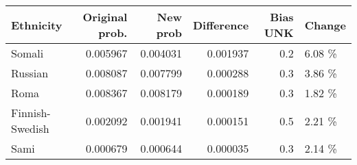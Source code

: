 \begin{tabular}{lrrrrl}
\toprule
      Ethnicity &  Original prob. &  New prob &  Difference &  Bias UNK & Change \\
\midrule
         Somali &        0.005967 &  0.004031 &    0.001937 &       0.2 & 6.08 \% \\
        Russian &        0.008087 &  0.007799 &    0.000288 &       0.3 & 3.86 \% \\
           Roma &        0.008367 &  0.008179 &    0.000189 &       0.3 & 1.82 \% \\
Finnish-Swedish &        0.002092 &  0.001941 &    0.000151 &       0.5 & 2.21 \% \\
           Sami &        0.000679 &  0.000644 &    0.000035 &       0.3 & 2.14 \% \\
\bottomrule
\end{tabular}
